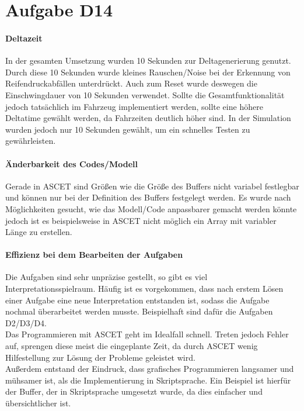 \chapter{Aufgabe D14}
\subsubsection{Deltazeit}
In der gesamten Umsetzung wurden 10 Sekunden zur Deltagenerierung genutzt. Durch diese 10 Sekunden wurde kleines Rauschen/Noise bei der Erkennung von Reifendruckabfällen unterdrückt. Auch zum Reset wurde deswegen die Einschwingdauer von 10 Sekunden verwendet.
Sollte die Gesamtfunktionalität jedoch tatsächlich im Fahrzeug implementiert werden, sollte eine höhere Deltatime gewählt werden, da Fahrzeiten deutlich höher sind. In der Simulation wurden jedoch nur 10 Sekunden gewählt, um ein schnelles Testen zu gewährleisten.

\subsubsection{Änderbarkeit des Codes/Modell}
Gerade in ASCET sind Größen wie die Größe des Buffers nicht variabel festlegbar und können nur bei der Definition des Buffers festgelegt werden. Es wurde nach Möglichkeiten gesucht, wie das Modell/Code anpassbarer gemacht werden könnte jedoch ist es beispielsweise in ASCET nicht möglich ein Array mit variabler Länge zu erstellen. 

\subsubsection{Effizienz bei dem Bearbeiten der Aufgaben}
Die Aufgaben sind sehr unpräzise gestellt, so gibt es viel Interpretationsspielraum. Häufig ist es vorgekommen, dass nach erstem Lösen einer Aufgabe eine neue Interpretation entstanden ist, sodass die Aufgabe nochmal überarbeitet werden musste. Beispielhaft sind dafür die Aufgaben D2/D3/D4.\\
Das Programmieren mit ASCET geht im Idealfall schnell. Treten jedoch Fehler auf, sprengen diese meist die eingeplante Zeit, da durch ASCET wenig Hilfestellung zur Lösung der Probleme geleistet wird.\\
Außerdem entstand der Eindruck, dass grafisches Programmieren langsamer und mühsamer ist, als die Implementierung in Skriptsprache. Ein Beispiel ist hierfür der Buffer, der in Skriptsprache umgesetzt wurde, da dies einfacher und übersichtlicher ist.\\

